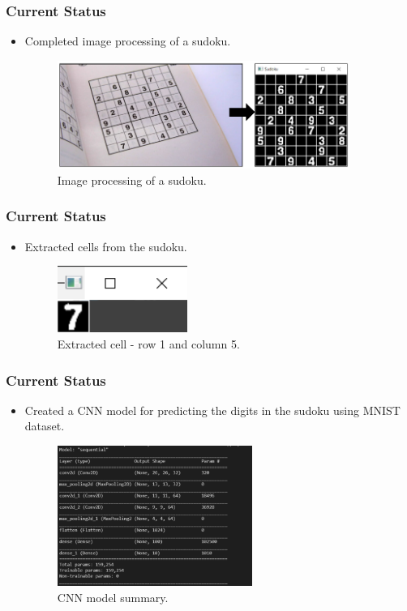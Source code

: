 \documentclass{beamer}
\begin{document}
\begin{frame}
	\frametitle{Current Status}
	\begin{itemize}
	    \item Completed image processing of a sudoku.  
		  \begin{figure}
		  \includegraphics[width=0.9\textwidth]{./week9_img/transformation.png}
		  \caption{Image processing of a sudoku.}
		  \centering
		  \end{figure}
	\end{itemize}
\end{frame}

\begin{frame}
	\frametitle{Current Status}
	\begin{itemize}
		  \item Extracted cells from the sudoku.
			\begin{figure}
			  \includegraphics[width=0.4\textwidth]{./week9_img/cell.PNG}
		  \caption{Extracted cell - row 1 and column 5.}
		  \centering
		  \end{figure}
	\end{itemize}
\end{frame}

\begin{frame}
	\frametitle{Current Status}
	\begin{itemize}
		\item Created a CNN model for predicting the digits in the sudoku using MNIST dataset.
		  \begin{figure}
			  \includegraphics[width=0.6\textwidth]{./week8_img/CNNModel.PNG}
		  \caption{CNN model summary.}
		  \centering
		  \end{figure}
	\end{itemize}
\end{frame}
\end{document}
